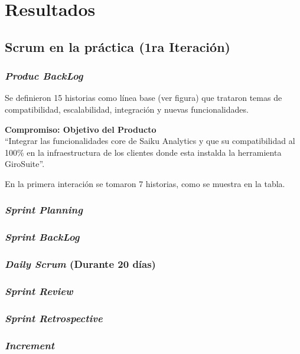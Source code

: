 \chapter{Resultados} \label{chapter:III}
\section{Scrum en la pr\'{a}ctica (1ra Iteraci\'{o}n)}
	\subsection{\textit{Produc BackLog}}
	Se definieron 15 historias como l\'{i}nea base (ver figura) que trataron temas de compatibilidad, escalabilidad, integraci\'{o}n y nuevas funcionalidades.
	
	\textbf{Compromiso: Objetivo del Producto}\\
	``Integrar las funcionalidades core de Saiku Analytics y que su compatibilidad al 100\% en la infraestructura de los clientes donde esta instalda la herramienta GiroSuite''.
	
	En la primera interaci\'{o}n se tomaron 7 historias, como se muestra en la tabla. 
	

	\subsection{\textit{Sprint Planning}}
	\subsection{\textit{Sprint BackLog}}
	\subsection{\textit{Daily Scrum} (Durante 20 d\'{i}as)}
	\subsection{\textit{Sprint Review}}
	\subsection{\textit{Sprint Retrospective}}
	
	\subsection{\textit{Increment}}